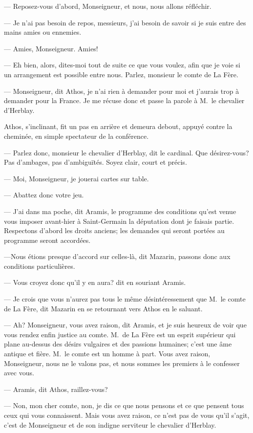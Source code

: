 — Reposez-vous d'abord, Monseigneur, et nous, nous allons réfléchir.

— Je n'ai pas besoin de repos, messieurs, j'ai besoin de savoir si je suis entre des mains amies ou ennemies.

— Amies, Monseigneur. Amies!

— Eh bien, alors, dites-moi tout de suite ce que vous voulez, afin que je voie si un arrangement est possible entre nous. Parlez, monsieur le comte de La Fère.

— Monseigneur, dit Athos, je n'ai rien à demander pour moi et j'aurais trop à demander pour la France. Je me récuse donc et passe la parole à M.~le chevalier d'Herblay.

Athos, s'inclinant, fit un pas en arrière et demeura debout, appuyé contre la cheminée, en simple spectateur de la conférence.

— Parlez donc, monsieur le chevalier d'Herblay, dit le cardinal. Que désirez-vous? Pas d'ambages, pas d'ambiguïtés. Soyez clair, court et précis.

— Moi, Monseigneur, je jouerai cartes sur table.

— Abattez donc votre jeu.

— J'ai dans ma poche, dit Aramis, le programme des conditions qu'est venue vous imposer avant-hier à Saint-Germain la députation dont je faisais partie. Respectons d'abord les droits anciens; les demandes qui seront portées au programme seront accordées.

—Nous étions presque d'accord sur celles-là, dit Mazarin, passons donc aux conditions particulières.

— Vous croyez donc qu'il y en aura? dit en souriant Aramis.

— Je crois que vous n'aurez pas tous le même désintéressement que M.~le comte de La Fère, dit Mazarin en se retournant vers Athos en le saluant.

— Ah? Monseigneur, vous avez raison, dit Aramis, et je suis heureux de voir que vous rendez enfin justice au comte. M.~de La Fère est un esprit supérieur qui plane au-dessus des désirs vulgaires et des passions humaines; c'est une âme antique et fière. M.~le comte est un homme à part. Vous avez raison, Monseigneur, nous ne le valons pas, et nous sommes les premiers à le confesser avec vous.

— Aramis, dit Athos, raillez-vous?

— Non, mon cher comte, non, je dis ce que nous pensons et ce que pensent tous ceux qui vous connaissent. Mais vous avez raison, ce n'est pas de vous qu'il s'agit, c'est de Monseigneur et de son indigne serviteur le chevalier d'Herblay.

